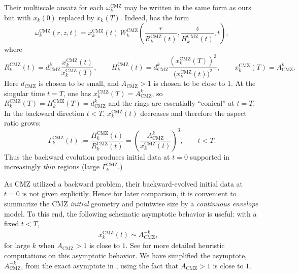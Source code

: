 \documentclass[reqno,11pt]{amsart}
\begin{document}
Their multiscale ansatz for each $\omega_k^{\mathrm{CMZ}}$ may be written in the same form as ours but with $x_k(0)$ replaced by $x_k(T)$. Indeed, \cite[Eq. (15)]{CordobaMartinezZheng25} has the form
\[
\omega^{\mathrm{CMZ}}_{k}(r,z,t)
=
x^{\mathrm{CMZ}}_{k}(t)\,
W^{\mathrm{CMZ}}_{k}\!\left(
\frac{r}{R^{\mathrm{CMZ}}_{k}(t)},
\frac{z}{H^{\mathrm{CMZ}}_{k}(t)},
t\right),
\]
where
\begin{equation*}
R^{\mathrm{CMZ}}_{k}(t)
= d_{\mathrm{CMZ}}^{k}\frac{x^{\mathrm{CMZ}}_{k}(t)}{x_k^{\mathrm{CMZ}}(T)},
\qquad
H^{\mathrm{CMZ}}_{k}(t)
= d_{\mathrm{CMZ}}^{k}\frac{(x_k^{\mathrm{CMZ}}(T))^2}{\bigl(x^{\mathrm{CMZ}}_{k}(t)\bigr)^2}, 
\qquad
x_k^{\mathrm{CMZ}}(T)=A^{k}_{\mathrm{CMZ}}.
\end{equation*}
Here $d_{\mathrm{CMZ}}$ is chosen to be small, and $A_{\mathrm{CMZ}}>1$ is chosen to be close to $1$.
At the singular time $t=T$, one has $x^{\mathrm{CMZ}}_{k}(T)=A_{\mathrm{CMZ}}^{k}$, so
$R^{\mathrm{CMZ}}_{k}(T)= H^{\mathrm{CMZ}}_{k}(T)=d_{\mathrm{CMZ}}^{k}$ and the rings
are essentially ``conical'' at $t=T$.  In the backward direction $t<T$, $x^{\mathrm{CMZ}}_{k}(t)$
decreases and therefore the aspect ratio grows:
\begin{equation}\label{eq:CMZ_aspect_ratio}
\Gamma^{\mathrm{CMZ}}_{k}(t)
:=
\frac{H^{\mathrm{CMZ}}_{k}(t)}{R^{\mathrm{CMZ}}_{k}(t)}
=
\left(\frac{A_{\mathrm{CMZ}}^{k}}{x^{\mathrm{CMZ}}_{k}(t)}\right)^{3},
\qquad t<T.
\end{equation}
Thus the backward evolution produces initial data at $t=0$ supported in increasingly
\emph{thin} regions (large $\Gamma^{\mathrm{CMZ}}_{k}$.)

As CMZ utilized a backward problem, their backward-evolved initial data at $t=0$ is not given explicitly. Hence
for later comparison, it is convenient to summarize the CMZ \emph{initial} geometry and pointwise
size by a \emph{continuous envelope} model.  To this end, the following schematic asymptotic behavior is useful: with a fixed $t<T$,
    \begin{align}
    \label{CMZ_x_k}
        x_k^{\mathrm{CMZ}}(t) \sim A^{-k}_{\mathrm{CMZ}} , \quad 
    \end{align}
    for large $k$ when $A_{\mathrm{CMZ}}>1$ is close to $1$.
See \cite[\S~1.3.2]{CordobaMartinezZheng25} for more detailed heuristic computations on this asymptotic behavior. We have simplified the asymptote, $A^{-k}_{\mathrm{CMZ}}$, from the exact asymptote in \cite[\S~1.3.2]{CordobaMartinezZheng25}, using the fact that $A_{\mathrm{CMZ}}>1$ is close to $1$.
\end{document}
